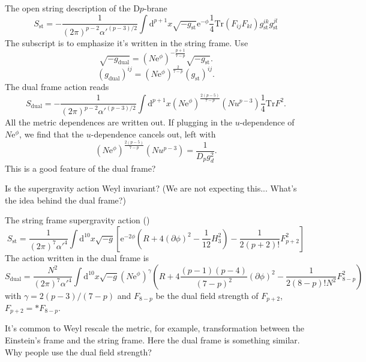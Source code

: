 The open string description of the D$p$-brane 
\begin{equation}
	S_{\text{st}} = - \frac{1}{(2\pi)^{p-2}\alpha'^{(p-3) / 2}}
	\int \mathrm{d}^{p+1} x \sqrt{-g_{\text{st}}} \mathrm{e}^{-\phi}
	\frac{1}{4} \mathrm{Tr}(F_{ij} F_{kl}) g_{\text{st}}^{ik}
	g_{\text{st}}^{jl}
\end{equation}
The subscript is to emphasize it's written in the string frame.
Use
\[
	\sqrt{-g_{\text{dual}}} = (N \mathrm{e}^\phi)^{- \frac{p+1}{7-p}}
	\sqrt{-g_{\text{st}}}
.\] 
\[
	(g_{\text{dual}})^{ij} = (N \mathrm{e}^\phi)^{\frac{2}{7-p}} (g_{\text{st}})^{ij}
.\] 
The dual frame action reads
\[
	S_{\text{dual}} = - \frac{1}{(2\pi)^{p-2}\alpha'^{(p-3) / 2}}
	\int \mathrm{d}^{p+1}x (N \mathrm{e}^\phi)^{\frac{2(p-5)}{7-p}}
	(N u^{p-3}) \frac{1}{4} \mathrm{Tr} F^2
.\] 
All the metric dependences are written out.
If plugging in the $u$-dependence of $N \mathrm{e}^\phi$,
we find that the $u$-dependence cancels out,
left with
\[
	(N \mathrm{e}^\phi)^{\frac{2(p-5)}{7-p}} (N u^{p-3}) = \frac{1}{D_p g_d^2}
.\] 
This is a good feature of the dual frame?

\begin{question}
	Is the supergravity action Weyl invariant? (We are not expecting this...
	What's the idea behind the dual frame?)
\end{question}

The string frame supergravity action ()
\begin{equation}
	S_{\text{st}} = \frac{1}{(2\pi)^7 \alpha'^4}
	\int \mathrm{d}^{10} x \sqrt{-g}
	\left[ \mathrm{e}^{-2\phi} (R + 4 (\partial\phi)^2 - \frac{1}{12}H_3^2)
	- \frac{1}{2(p+2)!}F_{p+2}^2\right] 
\end{equation}
The action written in the dual frame is 
\begin{equation}
	S_{\text{dual}} = \frac{N^2}{(2\pi)^7 \alpha'^4}
	\int \mathrm{d}^10 x \sqrt{-g}
	(N \mathrm{e}^\phi)^\gamma
	\left( R + 4 \frac{(p-1)(p-4)}{(7-p)^2} (\partial\phi)^2
	- \frac{1}{2(8-p)! N^2}F_{8-p}^2\right) 
\end{equation}
with $\gamma = 2(p-3)/(7-p)$ and $F_{8-p}$ be the dual field strength of $F_{p+2}$, $F_{p+2}= *F_{8-p}$.

It's common to Weyl rescale the metric, for example, transformation between the Einstein's frame and the string frame.
Here the dual frame is something similar. 
Why people use the dual field strength?

